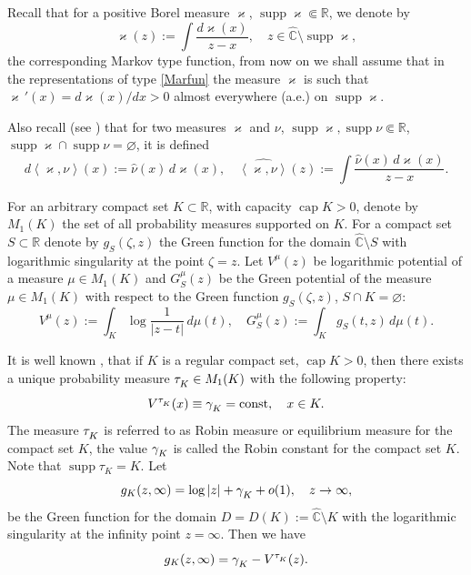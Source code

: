 \documentclass[11pt, a4paper, twoside]{article}
\def\<{\left\langle}
\def\>{\right\rangle}
\let\myh\widehat
\def\RR{\mathbb R}
\def\CC{\mathbb C}
\def\supp{\operatorname{supp}}
\def\mcap{\operatorname{cap}}
\def\const{\operatorname{const}}
\theoremstyle{plain}
\theoremstyle{definition}
\begin{document}
Recall that for a positive Borel measure 
 $\varkappa$, $\supp{\varkappa}\Subset\RR$, we denote by
\begin{equation}
\myh{\varkappa}(z):=\int\frac{d\varkappa(x)}{z-x},\quad z\in\myh{\CC}\setminus\supp{\varkappa},
\label{Marfun}
\end{equation}
the corresponding Markov type function, from now on we shall assume that in the representations of type \eqref{Marfun} the measure $\varkappa$ is such that $\varkappa\,'(x)=d\varkappa(x)/dx>0$ almost everywhere (a.e.) on $\supp{\varkappa}$.

Also recall (see \cite{GoRaSo97}) that for two measures $\varkappa$ and $\nu$, $\supp{\varkappa}, \supp{\nu}\Subset\RR$, 
$\supp{\varkappa}\cap\supp{\nu}=\varnothing$, it is defined
$$
d\<\varkappa,\nu\>(x):=\myh{\nu}(x)\,d\varkappa(x),
\quad
\myh{\<\varkappa,\nu\>}(z):=
\int\frac{\myh{\nu}(x)\,d\varkappa(x)}{z-x}.
$$

For an arbitrary compact set  $K\subset\RR$, with capacity $\mcap{K}>0$,   denote by  $M_1(K)$ the set of all probability measures supported on $K$. For a compact set  $S\subset\RR$ denote by $g_S(\zeta, z)$  the Green function for the domain $\myh {\CC}\setminus{S}$  with logarithmic singularity at the point $\zeta=z$.   Let $V ^\mu(z)$ be logarithmic potential of a measure $\mu\in M_1(K)$ and $G ^\mu_S(z)$  be the Green potential of the measure $\mu\in M_1(K)$ with respect to the Green function  $g_S(\zeta,z)$, $S\cap K=\varnothing$:
\begin{equation}
V^\mu(z):=\int_K\log\frac1{|z-t|}\,d\mu(t),\quad
G^\mu_S(z):=\int_K g_S(t,z)\,d\mu(t).
\label{pot}
\end{equation}

It is well known \cite{Lan66}, \cite{SaTo97} that if $K$ is a regular compact set, $\mcap{K}>0$, then there exists a unique probability  measure $\tau ^{\vphantom{p}}_K\in M_1(K)$ with the following property:
\begin{equation}
V^{\tau^{\vphantom{p}}_K}(x)\equiv\gamma^{\vphantom{p}}_K=\const,\quad x\in K.
\label{equrob}
\end{equation}
The measure $\tau^{\vphantom{p}}_K$ is referred to as Robin measure or equilibrium measure for the compact set $K$, the value  $\gamma^{\vphantom{p}}_K$ is called the Robin constant for the compact set $K$. Note that $\supp{\tau_K}=K$. Let  
$$
g_K(z,\infty)=\log|z|+\gamma^{\vphantom{p}}_K+o(1),\quad z\to\infty,
$$
be the Green function for the domain $D =D(K):=\myh{\CC}\setminus{K}$ with the logarithmic singularity at the infinity point $z=\infty$. Then we have
\begin{equation}
g_K(z,\infty)=\gamma^{\vphantom{p}}_K-V^{\tau^{\vphantom{p}}_K}(z).
\label{green}
\end{equation}
\end{document}
